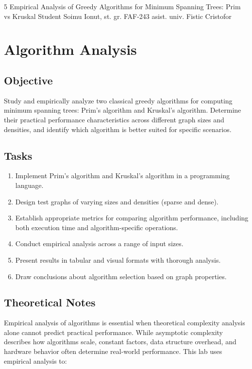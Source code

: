 \documentclass{labreport}
\begin{document}
\labtitle
    {5}
    {Empirical Analysis of Greedy Algorithms for Minimum Spanning Trees: Prim vs Kruskal}
    {Student}
    {Soimu Ionut, st. gr. FAF-243}
    {asist. univ. Fistic Cristofor}

\tableofcontents
\newpage

\lstset{style=python}

\section{Algorithm Analysis}

\subsection{Objective}

Study and empirically analyze two classical greedy algorithms for computing minimum spanning trees: Prim's algorithm and Kruskal's algorithm. Determine their practical performance characteristics across different graph sizes and densities, and identify which algorithm is better suited for specific scenarios.

\subsection{Tasks}

\begin{enumerate}
    \item Implement Prim's algorithm and Kruskal's algorithm in a programming language.
    \item Design test graphs of varying sizes and densities (sparse and dense).
    \item Establish appropriate metrics for comparing algorithm performance, including both execution time and algorithm-specific operations.
    \item Conduct empirical analysis across a range of input sizes.
    \item Present results in tabular and visual formats with thorough analysis.
    \item Draw conclusions about algorithm selection based on graph properties.
\end{enumerate}

\subsection{Theoretical Notes}

Empirical analysis of algorithms is essential when theoretical complexity analysis alone cannot predict practical performance. While asymptotic complexity describes how algorithms scale, constant factors, data structure overhead, and hardware behavior often determine real-world performance. This lab uses empirical analysis to:
\end{document}

